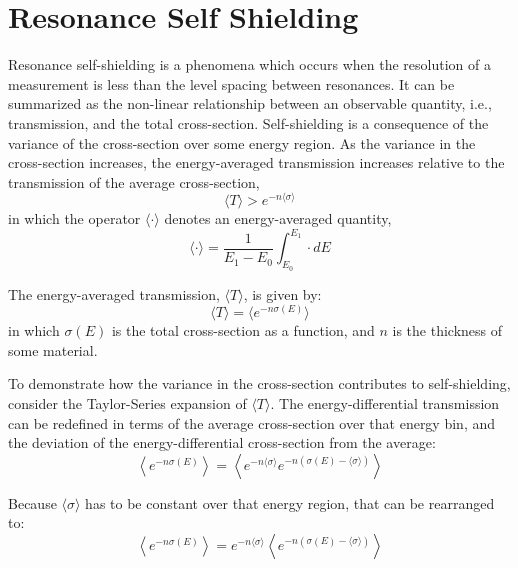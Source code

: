 \section{Resonance Self Shielding}
\label{sec:resonance-self-shielding}
Resonance self-shielding is a phenomena which occurs when the resolution of a measurement is less than the level spacing between resonances. It can be summarized as the non-linear relationship between an observable quantity, i.e., transmission, and the total cross-section. Self-shielding is a consequence of the variance of the cross-section over some energy region. As the variance in the cross-section increases, the energy-averaged transmission increases relative to the transmission of the average cross-section,
\begin{equation}
    \label{eq:self-shielding-definition}
    \langle T \rangle > e^{-n \langle \sigma \rangle}
\end{equation}
in which the operator $\langle \cdot \rangle$ denotes an energy-averaged quantity,
\begin{equation}
    \label{eq:energy-average-operator}
    \langle \cdot \rangle = \frac{1}{E_{1} - E_{0}} \int_{E_{0}}^{E_{1}} \cdot dE
\end{equation}

The energy-averaged transmission, $\langle T \rangle$, is given by:
\begin{equation}
    \label{eq:energy-average-Transmission}
    \langle T \rangle = \langle e^{-n \sigma(E)} \rangle
\end{equation}
in which $\sigma(E)$ is the total cross-section as a function, and $n$ is the thickness of some material.

To demonstrate how the variance in the cross-section contributes to self-shielding, consider the Taylor-Series expansion of $\langle T \rangle$. The energy-differential transmission can be redefined in terms of the average cross-section over that energy bin, and the deviation of the energy-differential cross-section from the average:
\begin{equation}
    \left\langle e^{-n \sigma(E)} \right\rangle = \left\langle e^{-n \langle \sigma \rangle} e^{-n \left(\sigma(E) - \langle \sigma \rangle \right)} \right\rangle
\end{equation}

Because $\langle \sigma \rangle$ has to be constant over that energy region, that can be rearranged to:
\begin{equation}
    \label{eq:taylor-series-step}
    \left\langle e^{-n \sigma(E)} \right\rangle = e^{-n \langle \sigma \rangle} \left\langle e^{-n \left( \sigma(E) - \langle \sigma \rangle \right)} \right\rangle
\end{equation}

